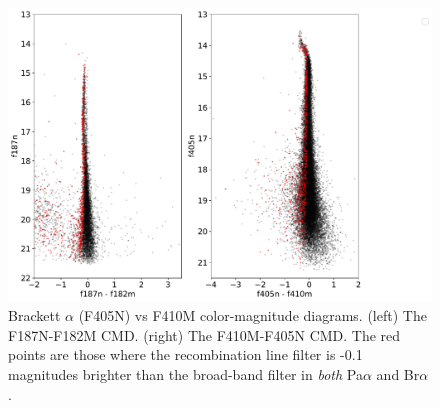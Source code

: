 \documentclass[times,astrosymb]{aastex631}
\begin{document}

\begin{figure}
    \centering
    \includegraphics[width=\textwidth]{figures/BrA_PaA_CMDs.pdf}
    \caption{Brackett $\alpha$ (F405N) vs F410M color-magnitude diagrams.
    (left) The F187N-F182M CMD.
    (right) The F410M-F405N CMD.
    The red points are those where the recombination line filter is -0.1 magnitudes brighter than the broad-band filter in \emph{both} Pa$\alpha$ and Br$\alpha$.
    }
    \label{fig:bracmds}
\end{figure}
\end{document}
